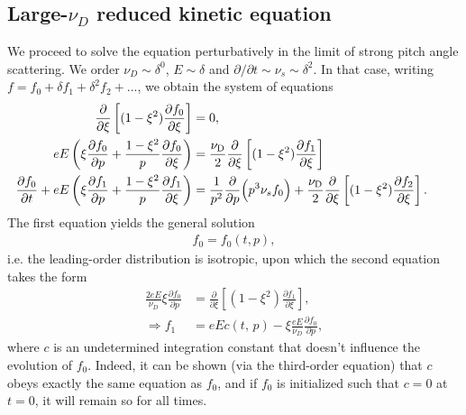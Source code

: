 \documentclass[11pt,a4paper]{article}
\newcommand{\sub}[1]{\ensuremath{_{\text{#1}}}}
\begin{document}

\subsection{Large-$\nu_D$ reduced kinetic equation}

We proceed to solve the equation perturbatively in the limit of strong pitch angle scattering. We order $\nu_D \sim \delta^0$, $E \sim \delta$ and $\partial/\partial t \sim \nu_s \sim \delta^2$. In that case, writing $f=f_0+\delta f_1+\delta^2 f_2 + ...$, we obtain the system of equations
\begin{align}
\frac{\partial}{\partial \xi}\left[(1-\xi^2)\frac{\partial f_0}{\partial \xi}\right] &= 0, \\
 eE\left(\xi\frac{\partial f_0}{\partial p} + \frac{1-\xi^2}{p}\frac{\partial f_0}{\partial \xi}\right) &=  \frac{\nu\sub{D}}{2}\frac{\partial}{\partial \xi}\left[(1-\xi^2)\frac{\partial f_1}{\partial \xi}\right] \\
\hspace{-7mm} \frac{\partial f_0}{\partial t} +eE \left(\xi\frac{\partial f_1}{\partial p} + \frac{1-\xi^2}{p}\frac{\partial f_1}{\partial \xi}\right) &= \frac{1}{p^2}\frac{\partial}{\partial p}\Big(p^3 \nu_s f_0\Big) + \frac{\nu\sub{D}}{2}\frac{\partial}{\partial \xi}\left[(1-\xi^2)\frac{\partial f_2}{\partial \xi}\right].
\end{align}
The first equation yields the general solution
\begin{align}
f_0 = f_0(t,p),
\end{align}
i.e. the leading-order distribution is isotropic, upon which the second equation takes the form
\begin{align}
\frac{2eE}{\nu_D}\xi\frac{\partial f_0}{\partial p } &=\frac{\partial}{\partial \xi}\left[(1-\xi^2)\frac{\partial f_1}{\partial \xi}\right], \nonumber \\
\Rightarrow f_1 &= eE c(t,\,p) - \xi \frac{eE}{\nu_D} \frac{\partial f_0}{\partial p},
\end{align}
where $c$ is an undetermined integration constant that doesn't influence the evolution of $f_0$. Indeed, it can be shown (via the third-order equation) that $c$ obeys exactly the same equation as $f_0$, and if $f_0$ is initialized such that $c=0$ at $t=0$, it will remain so for all times.
\end{document}
